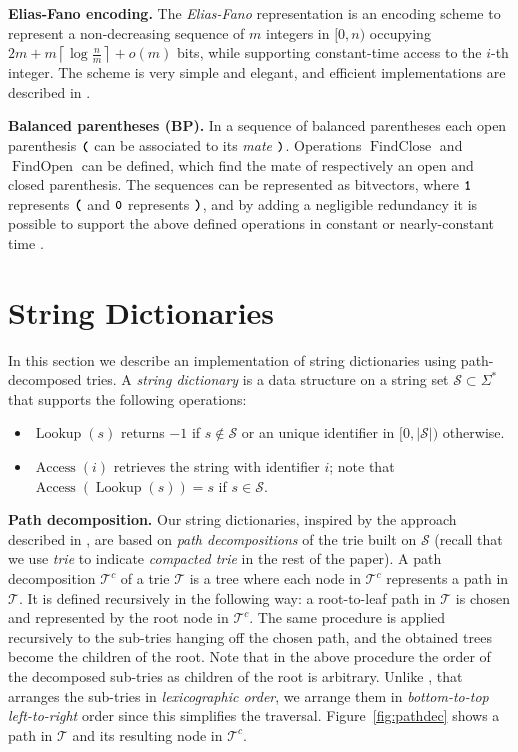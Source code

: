\documentclass[a4paper,11pt]{article}
\newcommand{\shrinkitems}{\setlength{\itemsep}{0ex}} \newcommand{\sshrinkitems}{\setlength{\itemsep}{-1ex}} \newcommand{\shrinktable}{\setlength{\abovecaptionskip}{-1ex}\setlength{\belowcaptionskip}{-1ex}}
\newcommand{\ttlpar}[1]{\noindent\textbf{#1}}
\theoremstyle{nonumberplain}
\DeclareMathOperator{\Access}{Access}
\DeclareMathOperator{\Lookup}{Lookup}
\DeclareMathOperator{\FindClose}{FindClose}
\DeclareMathOperator{\FindOpen}{FindOpen}
\newcommand{\bit}[1]{\text{\bf\texttt{#1}}}
\newcommand{\bitzero}{\bit{0}}
\newcommand{\bitone}{\bit{1}}
\newcommand{\paropen}{\text{\bf\texttt{(}}}
\newcommand{\parclose}{\text{\bf\texttt{)}}}
\begin{document}
\ttlpar{Elias-Fano encoding.} 
The \emph{Elias-Fano} representation \cite{elias74,fano71} is an
encoding scheme to represent a non-decreasing sequence of $m$ integers
in $[0, n)$ occupying $2m + m \left\lceil \log \frac n m \right\rceil
+ o(m)$ bits, while supporting constant-time access to the $i$-th
integer. 
The scheme is very simple and
elegant, and efficient implementations are described in
\cite{grossi05,sadaalx07,vigna08}.


\ttlpar{Balanced parentheses (BP).}  
In a sequence of balanced parentheses each open parenthesis $\paropen$
can be associated to its \emph{mate} $\parclose$. Operations
$\FindClose$ and $\FindOpen$ can be defined, which find the mate of
respectively an open and closed parenthesis. The sequences can be
represented as bitvectors, where $\bitone$ represents $\paropen$ and
$\bitzero$ represents $\parclose$, and by adding a negligible
redundancy it is possible to support the above defined operations in
constant or nearly-constant time \cite{jacobson89,munro97}.

\section{String Dictionaries}
\label{sec:stringdict}
In this section we describe an implementation of string dictionaries
using path-decomposed tries. A \emph{string dictionary} is a data
structure on a string set $\mathcal{S} \subset \Sigma^*$ that supports
the following operations:
\begin{itemize}
\shrinkitems
\item $\Lookup(s)$ returns $-1$ if $s \not\in \mathcal{S}$ or an
  unique identifier in $[0, |\mathcal{S}|)$ otherwise.
\item $\Access(i)$ retrieves the string with identifier $i$; note that
  $\Access(\Lookup(s)) = s$ if $s \in \mathcal{S}$.
\end{itemize}

\ttlpar{Path decomposition.}
Our string dictionaries, inspired by the approach described in
\cite{pods08}, are based on \emph{path decompositions} of the trie
built on $\mathcal{S}$ (recall that we use \emph{trie} to indicate 
\emph{compacted trie} in the rest of the paper).  A path decomposition
$\mathcal{T}^c$ of a trie $\mathcal{T}$ is a tree where each node in
$\mathcal{T}^c$ represents a path in $\mathcal{T}$. It is defined
recursively in the following way: a root-to-leaf path in $\mathcal{T}$
is chosen and represented by the root node in $\mathcal{T}^c$. The
same procedure is applied recursively to the sub-tries hanging off the
chosen path, and the obtained trees become the children of the root.
Note that in the above procedure the order of the decomposed sub-tries as
children of the root is arbitrary. Unlike \cite{pods08}, that arranges
the sub-tries in \emph{lexicographic order}, we arrange them in
\emph{bottom-to-top left-to-right} order since this simplifies the
traversal. Figure~\ref{fig:pathdec} shows a path in $\mathcal{T}$ and its resulting node in $\mathcal{T}^c$.
\end{document}
